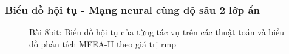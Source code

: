 \subsubsection{Biểu đồ hội tụ - Mạng neural cùng độ sâu 2 lớp ẩn}
\begin{figure}[h!]
    \centering
    \caption{Bài 8bit: Biểu đồ hội tụ của từng tác vụ trên các thuật toán và biểu đồ phân tích MFEA-II theo giá trị rmp}
    \label{fig:8bit_2layer}
\end{figure}
